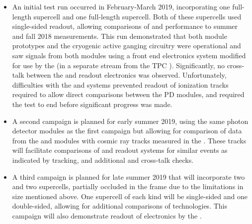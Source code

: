\begin{itemize}
    \item An initial test run occurred in February-March 2019, incorporating one full-length  supercell and one full-length  supercell.  Both of these supercells used single-sided readout, allowing comparisons of  and  performance to summer and fall 2018  measurements.  This run demonstrated that both module prototypes and the cryogenic active ganging circuitry were operational and saw signals from both modules using a  front end electronics system modified for use by the   (in a separate stream from the TPC ). Significantly, no cross-talk between the  and  readout electronics was observed.  Unfortunately, difficulties with the   and  systems prevented readout of ionization tracks required to allow direct comparisons between the PD modules, and required the test to end before significant progress was made.



    \item A second campaign is planned for early summer 2019, using the same photon detector modules as the first campaign but allowing for comparison of data from the  and  modules with cosmic ray tracks measured in the .  These tracks will facilitate comparisons of  and  readout systems for similar events as indicated by  tracking, and additional  and  cross-talk checks.

    \item A third campaign is planned for late summer 2019 that will incorporate two  and two  supercells, partially occluded in the frame due to the limitations in  size mentioned above.  One supercell of each kind will be single-sided and one double-sided, allowing for additional comparisons of  technologies.  This campaign will also demonstrate readout of  electronics by the  .
    
\end{itemize}

